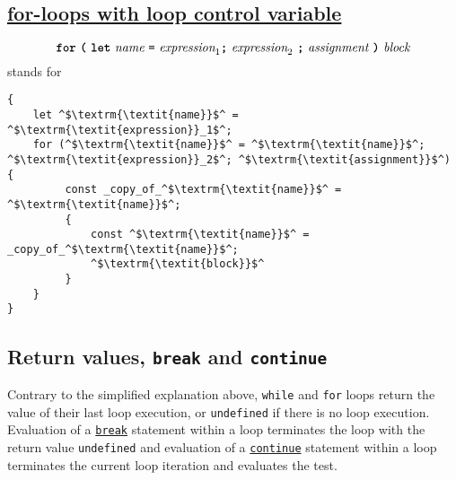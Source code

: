 \subsection*{\href{https://source-academy.github.io/sicp/chapters/4.1.2.html\#ex_4.9}{for-loops with loop control variable}}

\[\textbf{\texttt{for}}\ \textbf{\texttt{(}} \ 
\textbf{\texttt{let}}\ \textit{name}\ \texttt{=}\
\textit{expression}_1 \textbf{\texttt{;}} 
\ \textit{expression}_2 \ \textbf{\texttt{;}} \ \textit{assignment} \ \textbf{\texttt{)}} \ 
                                            \textit{block}
\]
stands for
\begin{center}
  \begin{minipage}{90mm}
  \begin{lstlisting}
{
    let ^$\textrm{\textit{name}}$^ = ^$\textrm{\textit{expression}}_1$^;
    for (^$\textrm{\textit{name}}$^ = ^$\textrm{\textit{name}}$^; ^$\textrm{\textit{expression}}_2$^; ^$\textrm{\textit{assignment}}$^) {
         const _copy_of_^$\textrm{\textit{name}}$^ = ^$\textrm{\textit{name}}$^;
         {
             const ^$\textrm{\textit{name}}$^ = _copy_of_^$\textrm{\textit{name}}$^;
             ^$\textrm{\textit{block}}$^
         }
    }
}
  \end{lstlisting}
  \end{minipage}

\end{center}

\subsection*{Return values, \lstinline{break} and \lstinline{continue}}

Contrary to the simplified explanation above, \lstinline{while} and \lstinline{for} loops return
the value of their last loop execution, or \lstinline{undefined} if there is no loop execution.
Evaluation of a \href{https://source-academy.github.io/sicp/chapters/4.1.2.html\#ex_4.7}{\lstinline{break}} statement within a loop terminates the loop with the return value
\lstinline{undefined} and evaluation of a \href{https://source-academy.github.io/sicp/chapters/4.1.2.html\#ex_4.7}{\lstinline{continue}} statement within a loop
terminates the current loop iteration and evaluates the test.


